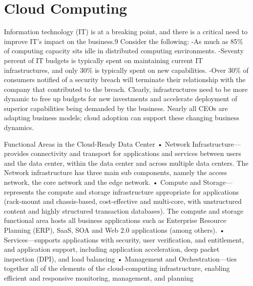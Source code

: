 \section{Cloud Computing}

Information technology (IT) is at a breaking point, and there is a critical need to improve IT's impact on the business.9
Consider the following:
 -As much as 85\% of computing capacity sits idle in distributed computing environments.
 -Seventy percent of IT budgets is typically spent on maintaining current IT infrastructures, and only 30\% is typically spent on new capabilities.
 -Over 30\% of consumers notified of a security breach will terminate their relationship with the company that contributed to the breach.
Clearly, infrastructures need to be more dynamic to free up budgets for new investments and accelerate deployment of superior capabilities being demanded by the business. Nearly all CEOs are adapting business models; cloud adoption can support these changing business dynamics.

Functional Areas in the Cloud-Ready Data Center
• Network Infrastructure—provides connectivity and transport for applications and services between users and the data center, within the data center and across multiple data centers. The Network infrastructure has three main sub components, namely the access network, the core network and the edge network.
• Compute and Storage—represents the compute and storage infrastructure appropriate for applications (rack-mount and chassis-based, cost-effective and multi-core, with unstructured content and highly structured transaction databases). The compute and storage functional area hosts all business applications such as Enterprise Resource Planning (ERP), SaaS, SOA and Web 2.0 applications (among others).
• Services—supports applications with security, user verification, and entitlement, and application support, including application acceleration, deep packet inspection (DPI), and load balancing
• Management and Orchestration—ties together all of the elements of the cloud-computing infrastructure, enabling efficient and responsive monitoring, management, and planning